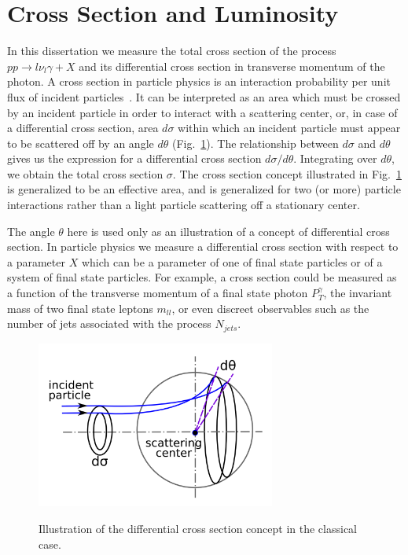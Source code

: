 \section{Cross Section and Luminosity}
\label{sec:WgAbout_LumiAndCS}

In this dissertation we measure the total cross section of the process $pp \rightarrow l \nu_l \gamma + X$ and its differential cross section in transverse momentum of the photon. A cross section in particle physics is an interaction probability per unit flux of incident particles~\cite{ref_fnal_LumiCS}. It can be interpreted as an area which must be crossed by an incident particle in order to interact with a scattering center, or, in case of a differential cross section, area $d\sigma$ within which an incident particle must appear to be scattered off by an angle $d\theta$ (Fig.~\ref{fig:CSclassical}). The relationship between $d\sigma$ and $d\theta$ gives us the expression for a differential cross section $d\sigma/d\theta$. Integrating over $d\theta$, we obtain the total cross section $\sigma$. The cross section concept illustrated in Fig.~\ref{fig:CSclassical} is generalized to be an effective area, and is generalized for two (or more) particle interactions rather than a light particle scattering off a stationary center. 

The angle $\theta$ here is used only as an illustration of a concept of differential cross section. In particle physics we measure a differential cross section with respect to a parameter $X$ which can be a parameter of one of final state particles or of a system of final state particles. For example, a cross section could be measured as a function of the transverse momentum of a final state photon $P_T^\gamma$, the invariant mass of two final state leptons $m_{ll}$, or even discreet observables such as the number of jets associated with the process $N_{jets}$. 

\begin{figure}[htb]
  \begin{center}
    {\includegraphics[width=0.70\textwidth]{../figs/WgAbout/CSclassical.png}}
    \caption{Illustration of the differential cross section concept in the classical case.}
    \label{fig:CSclassical}
  \end{center}
\end{figure}

